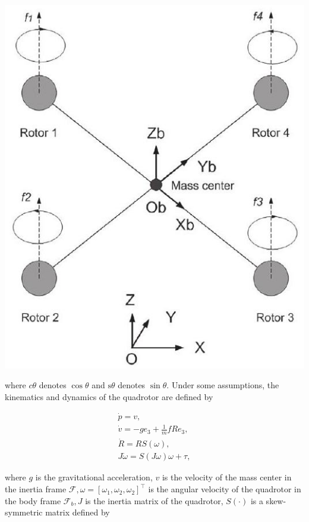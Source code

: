 \documentclass[10pt]{article}
\begin{document}
\begin{center}
\includegraphics[max width=\textwidth]{2023_10_07_eefdf58cc80a47c1244eg-03}
\end{center}

where $c \theta$ denotes $\cos \theta$ and $\mathrm{s} \theta$ denotes $\sin \theta$. Under some assumptions, the kinematics and dynamics of the quadrotor are defined by

$$
\begin{gathered}
\dot{p}=v, \\
\dot{v}=-g e_{3}+\frac{1}{m} f R e_{3}, \\
\dot{R}=R S(\omega), \\
J \dot{\omega}=S(J \omega) \omega+\tau,
\end{gathered}
$$

where $g$ is the gravitational acceleration, $v$ is the velocity of the mass center in the inertia frame $\mathcal{F}, \omega=\left[\omega_{1}, \omega_{2}, \omega_{2}\right]^{\top}$ is the angular velocity of the quadrotor in the body frame $\mathcal{F}_{b}, J$ is the inertia matrix of the quadrotor, $S(\cdot)$ is a skew-symmetric matrix defined by
\end{document}
